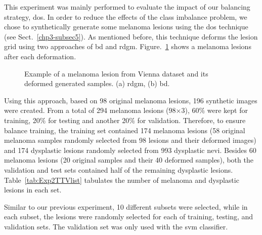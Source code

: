 This experiment was mainly performed to evaluate the impact of our balancing strategy, \acf{dos}.
In order to reduce the effects of the class imbalance problem, we chose to synthetically generate some melanoma lesions using the \ac{dos} technique (see Sect.~\ref{chp3-subsec5}).
As mentioned before, this technique deforms the lesion grid using two approaches of \acf{bd} and \acf{rdgm}. 
Figure.~\ref{fig:DSOS-example} shows a melanoma lesions after each deformation.
\begin{figure}[H]
\centering
{}
\caption[Data space over sampling example]{Example of a melanoma lesion from Vienna dataset and its deformed generated samples. (a) \ac{rdgm}, (b) \ac{bd}.}
\label{fig:DSOS-example}
\end{figure}

Using this approach, based on 98 original melanoma lesions, 196 synthetic images were created.
From a total of 294 melanoma lesions (98$\times$3), 60$\%$ were kept for training, 20$\%$ for testing and another 20$\%$ for validation.
Therefore, to ensure balance training, the training set contained 174 melanoma lesions (58 original melanoma samples randomly selected from 98 lesions and their deformed images) and 174 dysplastic lesions randomly selected from 993 dysplastic nevi.
Besides 60 melanoma lesions (20 original samples and their 40 deformed samples), both the validation and test sets contained half of the remaining dysplastic lesions.
Table~\ref{tab:Exp2TTVlist} tabulates the number of melanoma and dysplastic lesions in each set.

Similar to our previous experiment, 10 different subsets were selected, while in each subset, the lesions were randomly selected for each of training, testing, and validation sets.
The validation set was only used with the \ac{svm} classifier.

